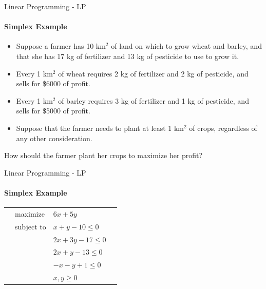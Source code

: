 \documentclass{beamer}
\begin{document}
	\begin{frame}{Linear Programming - LP}
		\framesubtitle{Simplex Example}
		\begin{itemize}
			\item Suppose a farmer has 10 km$^2$ of land on which to grow wheat and barley, and that she has 17 kg of fertilizer and 13 kg of pesticide to use to grow it. 
			\item Every 1 km$^2$ of wheat requires 2 kg of fertilizer and 2 kg of pesticide, and sells for \$6000 of profit.
			\item Every 1 km$^2$ of barley requires 3 kg of fertilizer and 1 kg of pesticide, and sells for \$5000 of profit. 
			\item Suppose that the farmer needs to plant at least 1 km$^2$ of crops, regardless of any other consideration. 
		\end{itemize}
		How should the farmer plant her crops to maximize her profit?
	\end{frame}
%	
%
	\begin{frame}{Linear Programming - LP}
		\framesubtitle{Simplex Example}
		\begin{tabularx}{\textwidth}{X l l X}
			& maximize		& $6x + 5y$		& \\
			& subject to	& $x + y - 10 \leq 0$	& \\
			& 				& $2x + 3y - 17 \leq 0$	& \\
			& 				& $2x + y - 13 \leq 0$ & \\
			& 				& $-x-y + 1 \leq 0$ & \\
			& 				& $x, y \geq 0$ & 
		\end{tabularx}
	\end{frame}
\end{document}
